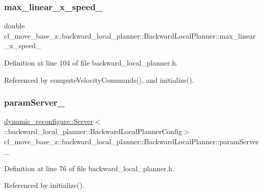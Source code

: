 \subsubsection{\texorpdfstring{max\+\_\+linear\+\_\+x\+\_\+speed\+\_\+}{max\_linear\_x\_speed\_}}
{\footnotesize\ttfamily double cl\+\_\+move\+\_\+base\+\_\+z\+::backward\+\_\+local\+\_\+planner\+::\+Backward\+Local\+Planner\+::max\+\_\+linear\+\_\+x\+\_\+speed\+\_\+\hspace{0.3cm}{\ttfamily [private]}}



Definition at line 104 of file backward\+\_\+local\+\_\+planner.\+h.



Referenced by compute\+Velocity\+Commands(), and initialize().

\mbox{\label{classcl__move__base__z_1_1backward__local__planner_1_1BackwardLocalPlanner_afb349461ce9c4edee018dbb822a8cd9a}} 
\subsubsection{\texorpdfstring{param\+Server\+\_\+}{paramServer\_}}
{\footnotesize\ttfamily \hyperlink{sm__ridgeback__floor__coverage__static__1_2servers_2led__action__server_2src_2led__action__server__node_8cpp_a280552a59985eb5d9311dba701679363}{dynamic\+\_\+reconfigure\+::\+Server}$<$\+::backward\+\_\+local\+\_\+planner\+::\+Backward\+Local\+Planner\+Config$>$ cl\+\_\+move\+\_\+base\+\_\+z\+::backward\+\_\+local\+\_\+planner\+::\+Backward\+Local\+Planner\+::param\+Server\+\_\+\hspace{0.3cm}{\ttfamily [private]}}



Definition at line 76 of file backward\+\_\+local\+\_\+planner.\+h.



Referenced by initialize().

